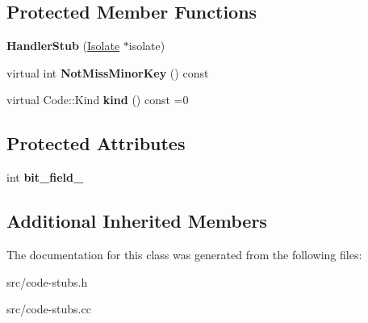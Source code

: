 \subsection*{Protected Member Functions}
\begin{DoxyCompactItemize}
\item 
\hypertarget{classv8_1_1internal_1_1_handler_stub_ab270255ab1c2683a07692658637ac35e}{}{\bfseries Handler\+Stub} (\hyperlink{classv8_1_1internal_1_1_isolate}{Isolate} $\ast$isolate)\label{classv8_1_1internal_1_1_handler_stub_ab270255ab1c2683a07692658637ac35e}

\item 
\hypertarget{classv8_1_1internal_1_1_handler_stub_a248f53f548b68f135c530d4fabb94d7e}{}virtual int {\bfseries Not\+Miss\+Minor\+Key} () const \label{classv8_1_1internal_1_1_handler_stub_a248f53f548b68f135c530d4fabb94d7e}

\item 
\hypertarget{classv8_1_1internal_1_1_handler_stub_acdab0a399359a651a2958d442057bfce}{}virtual Code\+::\+Kind {\bfseries kind} () const =0\label{classv8_1_1internal_1_1_handler_stub_acdab0a399359a651a2958d442057bfce}

\end{DoxyCompactItemize}
\subsection*{Protected Attributes}
\begin{DoxyCompactItemize}
\item 
\hypertarget{classv8_1_1internal_1_1_handler_stub_a1addc61e729c1a793f21c55d67a959ba}{}int {\bfseries bit\+\_\+field\+\_\+}\label{classv8_1_1internal_1_1_handler_stub_a1addc61e729c1a793f21c55d67a959ba}

\end{DoxyCompactItemize}
\subsection*{Additional Inherited Members}


The documentation for this class was generated from the following files\+:\begin{DoxyCompactItemize}
\item 
src/code-\/stubs.\+h\item 
src/code-\/stubs.\+cc\end{DoxyCompactItemize}
